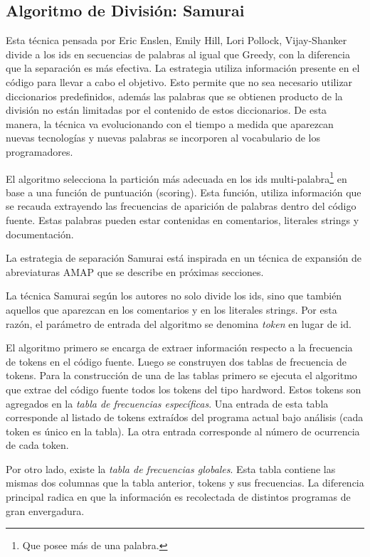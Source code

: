 \documentclass[a4paper,12pt]{report}
\begin{document}
\subsection{Algoritmo de División: Samurai}

Esta técnica pensada por Eric Enslen, Emily Hill, Lori Pollock, Vijay-Shanker \cite{EHPV09} divide a los ids en secuencias de palabras al igual que Greedy, con la diferencia que la separación es más efectiva. La estrategia utiliza información presente en el código para llevar a cabo el objetivo. Esto permite que no sea necesario utilizar diccionarios predefinidos, además las palabras que se obtienen producto de la división no están limitadas por el contenido de estos diccionarios. De esta manera, la técnica va evolucionando con el tiempo a medida que aparezcan nuevas tecnologías y nuevas palabras se incorporen al vocabulario de los programadores.

El algoritmo selecciona la partición más adecuada en los ids multi-palabra\footnote[1]{Que posee más de una palabra.} en base a una función de puntuación (scoring). Esta función, utiliza información que se recauda extrayendo las frecuencias de aparición de palabras dentro del código fuente. Estas palabras pueden estar contenidas en comentarios, literales strings y documentación.

La estrategia de separación Samurai está inspirada en un técnica de expansión de abreviaturas AMAP \cite{EZH08} que se describe en próximas secciones.

La técnica Samurai según los autores \cite{EHPV09} no solo divide los ids, sino que también aquellos que aparezcan en los comentarios y en los literales strings. 
Por esta razón, el parámetro de entrada del algoritmo se denomina \textit{token} en lugar de id.

El algoritmo primero se encarga de extraer información respecto a la frecuencia de tokens en el código fuente. Luego se construyen dos tablas de frecuencia de tokens. Para la construcción de una de las tablas primero se ejecuta el algoritmo que extrae del código fuente todos los tokens del tipo hardword. Estos tokens son agregados en la \textit{tabla de frecuencias específicas}. Una entrada de esta tabla corresponde al listado de tokens extraídos del programa actual bajo análisis (cada token es único en la tabla). La otra entrada corresponde al número de ocurrencia de cada token. 

Por otro lado, existe la \textit{tabla de frecuencias globales}. Esta tabla contiene las mismas dos columnas que la tabla anterior, tokens y sus frecuencias. La diferencia principal radica en que la información es recolectada de distintos programas de gran envergadura. 
\end{document}
